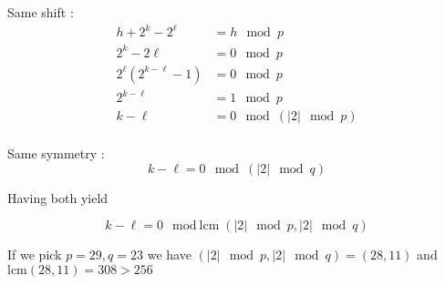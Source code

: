 \documentclass{article}
\begin{document}
Same shift : 
\begin{align*}
	h + 2^k - 2^\ell &= h \mod p \\
	2^k - 2\ell &= 0 \mod p\\
	2^\ell( 2^{k-\ell} - 1) &= 0 \mod p\\
 	2^{k-\ell} &= 1 \mod p\\
	k - \ell &= 0 \mod (|2| \mod p)\\
\end{align*}

Same symmetry :
$$k - \ell = 0 \mod (|2| \mod q)$$

Having both yield

$$k - \ell = 0 \mod \text{lcm}(|2| \mod p,|2| \mod q)$$

If we pick $p = 29, q = 23$ we have $(|2| \mod p,|2| \mod q) = (28, 11)$ and $\text{lcm}(28,11) = 308 > 256$

\newpage
\def \s{0.5cm}




























\end{document}
